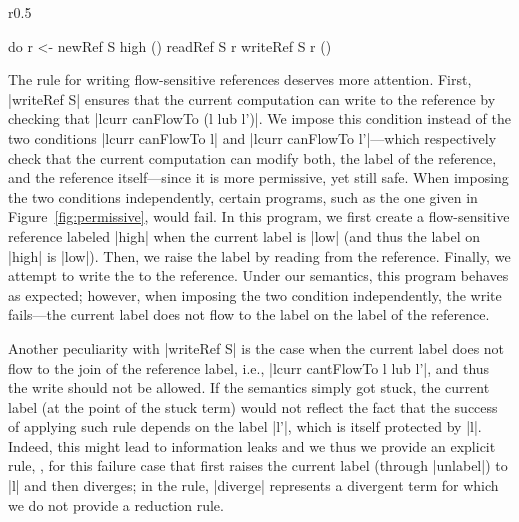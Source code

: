 \begin{wrapfigure}{r}{0.5\columnwidth}
\vspace{-15pt}
\begin{code}
do  r <- newRef S high ()
    readRef S r
    writeRef S r ()
\end{code}
\vspace{-15pt}
\caption{\label{fig:permissive} Permissiveness.}
\end{wrapfigure}
%
The rule for writing flow-sensitive references deserves more
attention.
%
First, |writeRef S| ensures that the current computation can write to
the reference by checking that |lcurr canFlowTo (l lub l')|.
%
We impose this condition instead of the two conditions |lcurr
canFlowTo l| and |lcurr canFlowTo l'|---which respectively check that
the current computation can modify both, the label of the reference,
and the reference itself---since it is more permissive, yet still
safe.
%
When imposing the two conditions independently, certain programs, such
as the one given in Figure~\ref{fig:permissive}, would fail.
%
In this program, we first create a flow-sensitive reference labeled
|high| when the current label is |low| (and thus the label on |high|
is |low|).
%
Then, we raise the label by reading from the reference.
%
Finally, we attempt to write the to the reference.
%
Under our semantics, this program behaves as expected; however, when
imposing the two condition independently, the write fails---the
current label does not flow to the label on the label of the
reference.
 
Another peculiarity with |writeRef S| is the case when the current label does not
flow to the join of the reference label, i.e., |lcurr cantFlowTo l lub l'|, and
thus the write should not be allowed.
%
If the semantics simply got stuck, the current label (at the point of
the stuck term) would
not reflect the fact that the success of applying such rule depends on the
label |l'|, which is itself protected by |l|.
%
Indeed, this might lead to information leaks and we thus we provide an
explicit rule, , for this failure case that
first raises the current label (through |unlabel|) to |l| and then
diverges; in the rule, |diverge| represents a divergent term for which
we do not provide a reduction rule.

